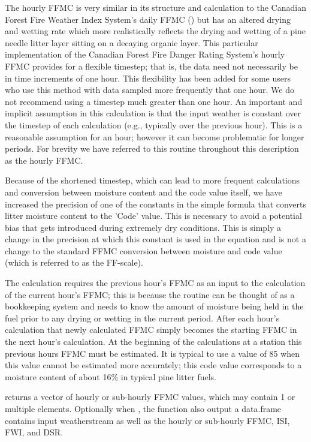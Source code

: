 \documentclass[a4paper]{book}
\begin{document}
%
\begin{Details}\relax
The hourly FFMC is very similar in its structure and calculation to the
Canadian Forest Fire Weather Index System's daily FFMC ()
but has an altered drying and wetting rate which more realistically reflects
the drying and wetting of a pine needle litter layer sitting on a decaying
organic layer.  This particular implementation of the Canadian Forest Fire
Danger Rating System's hourly FFMC provides for a flexible timestep; that
is, the data need not necessarily be in time increments of one hour.  This
flexibility has been added for some users who use this method with data
sampled more frequently that one hour.  We do not recommend using a timestep
much greater than one hour. An important and implicit assumption in this
calculation is that the input weather is constant over the timestep of each
calculation (e.g., typically over the previous hour).  This is a reasonable
assumption for an hour; however it can become problematic for longer
periods.  For brevity we have referred to this routine throughout this
description as the hourly FFMC.

Because of the shortened timestep, which can lead to more frequent
calculations and conversion between moisture content and the code value
itself, we have increased the precision of one of the constants in the
simple formula that converts litter moisture content to the 'Code' value.
This is necessary to avoid a potential bias that gets introduced during
extremely dry conditions.  This is simply a change in the precision at which
this constant is used in the equation and is not a change to the standard
FFMC conversion between moisture and code value (which is referred to as the
FF-scale).

The calculation requires the previous hour's FFMC as an input to the
calculation of the current hour's FFMC; this is because the routine can be
thought of as a bookkeeping system and needs to know the amount of moisture
being held in the fuel prior to any drying or wetting in the current period.
After each hour's calculation that newly calculated FFMC simply becomes the
starting FFMC in the next hour's calculation.  At the beginning of the
calculations at a station this previous hours FFMC must be estimated. It is
typical to use a value of 85 when this value cannot be estimated more
accurately; this code value corresponds to a moisture content of about 16\%
in typical pine litter fuels.
\end{Details}
%
\begin{Value}
 returns a vector of hourly or sub-hourly FFMC
values, which may contain 1 or multiple elements. Optionally when
, the function also output a data.frame contains input
weatherstream as well as the hourly or sub-hourly FFMC, ISI, FWI, and DSR.
\end{Value}
\end{document}
